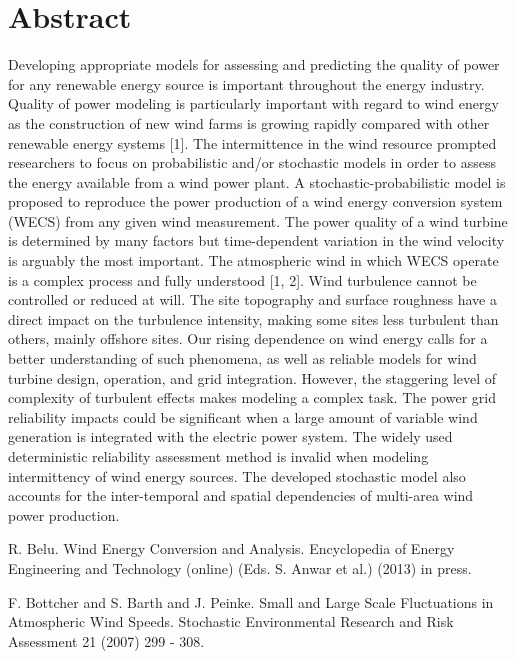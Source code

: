 \documentclass[article,A4,11pt]{llncs}%
\begin{document}
\section*{Abstract}
Developing appropriate models for assessing and predicting the quality of power for any renewable energy source is important throughout the energy industry. Quality of power modeling is particularly important with regard to wind energy as the construction of new wind farms is growing rapidly compared with other renewable energy systems [1]. The intermittence in the wind resource prompted researchers to focus on probabilistic and/or stochastic models in order to assess the energy available from a wind power plant. A stochastic-probabilistic model is proposed to reproduce the power production of a wind energy conversion system (WECS) from any given wind measurement. The power quality of a wind turbine is determined by many factors but time-dependent variation in the wind velocity is arguably the most important. The atmospheric wind in which WECS operate is a complex process and fully understood [1, 2]. Wind turbulence cannot be controlled or reduced at will. The site topography and surface roughness have a direct impact on the turbulence intensity, making some sites less turbulent than others, mainly offshore sites. Our rising dependence on wind energy calls for a better understanding of such phenomena, as well as reliable models for wind turbine design, operation, and grid integration. However, the staggering level of complexity of turbulent effects makes modeling a complex task. The power grid reliability impacts could be significant when a large amount of variable wind generation is integrated with the electric power system. The widely used deterministic reliability assessment method is invalid when modeling intermittency of wind energy sources. The developed stochastic model also accounts for the inter-temporal and spatial dependencies of multi-area wind power production.


\begin{thebibliography}{10}
{\sc R. Belu}. {Wind Energy Conversion and Analysis}. Encyclopedia of Energy Engineering and Technology (online) (Eds. S. Anwar et al.) (2013) in press.

{\sc F. Bottcher and S. Barth and J. Peinke}. {Small and Large Scale Fluctuations in Atmospheric Wind Speeds}. Stochastic Environmental Research and Risk Assessment 21 (2007) 299 - 308.
\end{thebibliography}
\end{document}
